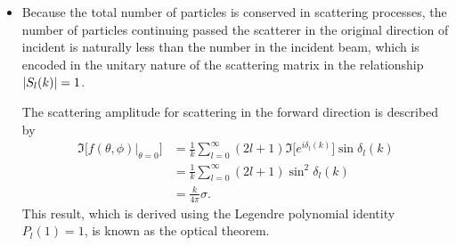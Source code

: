 \documentclass[11pt, a4paper]{article}
\begin{document}
\begin{itemize}
    \item Because the total number of particles is conserved in scattering processes, the number of particles continuing passed the scatterer in the original direction of incident is naturally less than the number in the incident beam, which is encoded in the unitary nature of the scattering matrix in the relationship $ \abs{S_{l}(k)} = 1 $. 

    The scattering amplitude for scattering in the forward direction is described by
    \begin{align*}
        \Im \big[ f(\theta, \phi)\big |_{\theta = 0} \big] &= \frac{1}{k} \sum_{l = 0}^{\infty} (2l + 1) \Im \big[ e^{i\delta_{l}(k)} \big] \sin \delta_{l}(k) \\
        & = \frac{1}{k} \sum_{l = 0}^{\infty} (2l + 1) \sin^{2} \delta_{l}(k)\\
        &= \frac{k}{4\pi} \sigma.
    \end{align*}
    This result, which is derived using the Legendre polynomial identity $ P_{l}(1) = 1 $, is known as the optical theorem. 
    
    
\end{itemize}
\end{document}
